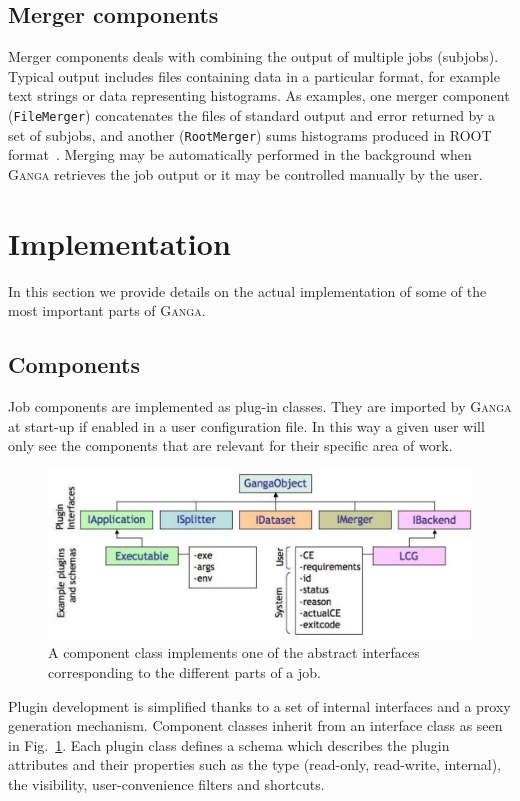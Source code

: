 \documentclass{elsart}
\def\ganga {\textsc{Ganga}\xspace}
\newcommand{\code}[1]{\texttt{#1}}
\begin{document}
\subsection{Merger components}
Merger components deals with combining the output of multiple jobs
(subjobs). Typical output includes files containing data in a
particular format, for example text strings or data representing
histograms. As examples, one merger component (\code{FileMerger})
concatenates the files of standard output and error returned by a set
of subjobs, and another (\code{RootMerger}) sums histograms produced
in ROOT format~\cite{ROOT}. Merging may be automatically performed in
the background when \ganga retrieves the job output or it may be
controlled manually by the user.

\section{Implementation}
\label{sec:implementation}
In this section we provide details on the actual implementation of some of the
most important parts of \ganga.

\subsection{Components}
\label{sec:ComponentImplementation}
Job components are implemented as plug-in classes. They are imported by \ganga
at start-up if enabled in a user configuration file. In this way a given user
will only see the components that are relevant for their specific area of
work.

\begin{figure}
  \centering
  \includegraphics[width=14cm]{GangaPlugin.pdf}  
  \caption{A component class implements one of the abstract interfaces
    corresponding to the different parts of a job.}
  \label{fig:Components}
\end{figure}
Plugin development is simplified thanks to a set of internal interfaces and a
proxy generation mechanism. Component classes inherit from an interface class
as seen in Fig.~\ref{fig:Components}. Each plugin class defines a schema which
describes the plugin attributes and their properties such as the type
(read-only, read-write, internal), the visibility, user-convenience filters
and shortcuts.
\end{document}
